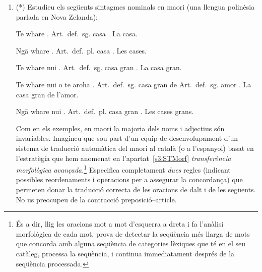 \begin{enumerate}
\item (*) Estudieu els següents sintagmes nominals en maori (una
  llengua polinèsia parlada en Nova Zelanda):

     \begin{example}
     \gll Te whare .
          \textsf{Art.\ def.\ sg.} casa .
     \glt La casa.
     \glend
     \end{example}

     \begin{example}
     \gll Ng\={a} whare  .
          \textsf{Art.\ def.\ pl.} casa .
     \glt Les cases.
     \glend
     \end{example}

     \begin{example}
     \gll Te whare nui .
          \textsf{Art.\ def.\ sg.} casa gran .
     \glt La casa gran.
     \glend
     \end{example}

     \begin{example}
     \gll Te whare nui o te aroha .
          \textsf{Art.\ def.\ sg.} casa gran de \textsf{Art.\ def.\
          sg.} amor .
     \glt La casa gran de l'amor.
     \glend
     \end{example}

     \begin{example}
     \gll Ng\={a} whare nui . 
          \textsf{Art.\ def.\ pl.} casa gran .
     \glt Les cases grans.
     \glend
     \end{example}
     
  Com en els exemples, en maori la majoria dels noms i adjectius són
  invariables.  Imagineu que sou part d'un equip de desenvolupament
  d'un sistema de traducció automàtica del maori al català (o a
  l'espanyol) basat en l'estratègia que hem anomenat en
  l'apartat~\ref{s3:STMorf} \emph{transferència morfològica
    avançada}.\footnote{És a dir, llig les oracions mot a mot
    d'esquerra a dreta i fa l'anàlisi morfològica de cada mot, prova
    de detectar la seqüència més llarga de mots que concorda amb
    alguna seqüència de categories lèxiques que té en el seu catàleg,
    processa la seqüència, i continua immediatament després de la
    seqüència processada.}  Especifica completament \emph{dues}
  regles (indicant possibles reordenaments i operacions per a
  assegurar la con\-cordança) que permeten donar la traducció correcta
  de les oracions de dalt i de les següents.  No us preocupeu de la
  contracció preposició--article.


\end{enumerate}
